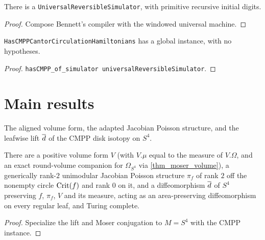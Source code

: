 \begin{theorem}
\label{thm_simulator}
\leanok
{}
There is a \texttt{UniversalReversibleSimulator}, with primitive recursive initial digits.
\end{theorem}
\begin{proof}\leanok
Compose Bennett's compiler with the windowed universal machine.
\end{proof}

\begin{theorem}
\label{thm_cmpp_instance}
\leanok
{}
\texttt{HasCMPPCantorCirculationHamiltonians} has a global instance, with no hypotheses.
\end{theorem}
\begin{proof}\leanok
\texttt{hasCMPP\_of\_simulator universalReversibleSimulator}.
\end{proof}

\chapter{Main results}
\label{chap_main}

\begin{definition}
\label{def_s4_structures}
\leanok
{}
The aligned volume form, the adapted Jacobian Poisson structure, and the leafwise lift
$\overline{d}$ of the CMPP disk isotopy on $S^4$.
\end{definition}

\begin{theorem}
\label{thm_main_s4}
\leanok
{}
There are a positive volume form $V$ (with $V.\mu$ equal to the measure of $V.\Omega$, and an exact
round-volume companion for $\Omega_{S^4}$ via \cref{thm_moser_volume}), a generically rank-$2$
unimodular Jacobian Poisson structure $\pi_f$ of rank $2$ off the nonempty circle $\mathrm{Crit}(f)$ and
rank $0$ on it, and a diffeomorphism $\overline{d}$ of $S^4$ preserving $f$, $\pi_f$, $V$ and its measure,
acting as an area-preserving diffeomorphism on every regular leaf, and Turing complete.
\end{theorem}
\begin{proof}\leanok
Specialize the lift and Moser conjugation to $M=S^4$ with the CMPP instance.
\end{proof}

